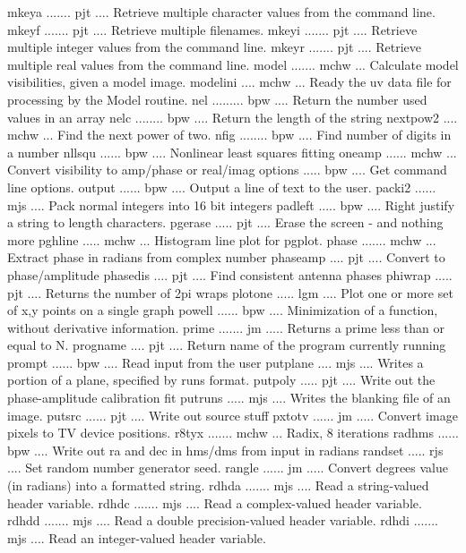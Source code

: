 {\eightpoint\begintt
mkeya ....... pjt .... Retrieve multiple character values from the command line.
mkeyf ....... pjt .... Retrieve multiple filenames. 
mkeyi ....... pjt .... Retrieve multiple integer values from the command line. 
mkeyr ....... pjt .... Retrieve multiple real values from the command line. 
model ....... mchw ... Calculate model visibilities, given a model image. 
\endtt}
{\eightpoint\begintt
modelini .... mchw ... Ready the uv data file for processing by the Model routine. 
nel ......... bpw .... Return the number used values in an array 
nelc ........ bpw .... Return the length of the string 
nextpow2 .... mchw ... Find the next power of two. 
nfig ........ bpw .... Find number of digits in a number 
\endtt}
{\eightpoint\begintt
nllsqu ...... bpw .... Nonlinear least squares fitting 
oneamp ...... mchw ... Convert visibility to amp/phase or real/imag 
options ..... bpw .... Get command line options. 
output ...... bpw .... Output a line of text to the user. 
packi2 ...... mjs .... Pack normal integers into 16 bit integers 
\endtt}
{\eightpoint\begintt
padleft ..... bpw .... Right justify a string to length characters. 
pgerase ..... pjt .... Erase the screen - and nothing more 
pghline ..... mchw ... Histogram line plot for pgplot. 
phase ....... mchw ... Extract phase in radians from complex number 
phaseamp .... pjt .... Convert to phase/amplitude 
\endtt}
{\eightpoint\begintt
phasedis .... pjt .... Find consistent antenna phases 
phiwrap ..... pjt .... Returns the number of 2pi wraps 
plotone ..... lgm .... Plot one or more set of x,y points on a single graph 
powell ...... bpw .... Minimization of a function, without derivative information. 
prime ....... jm ..... Returns a prime less than or equal to N. 
\endtt}
{\eightpoint\begintt
progname .... pjt .... Return name of the program currently running 
prompt ...... bpw .... Read input from the user 
putplane .... mjs .... Writes a portion of a plane, specified by runs format. 
putpoly ..... pjt .... Write out the phase-amplitude calibration fit 
putruns ..... mjs .... Writes the blanking file of an image. 
\endtt}
{\eightpoint\begintt
putsrc ...... pjt .... Write out source stuff 
pxtotv ...... jm ..... Convert image pixels to TV device positions. 
r8tyx ....... mchw ... Radix, 8 iterations 
radhms ...... bpw .... Write out ra and dec in hms/dms from input in radians 
randset ..... rjs .... Set random number generator seed. 
\endtt}
{\eightpoint\begintt
rangle ...... jm ..... Convert degrees value (in radians) into a formatted string. 
rdhda ....... mjs .... Read a string-valued header variable. 
rdhdc ....... mjs .... Read a complex-valued header variable. 
rdhdd ....... mjs .... Read a double precision-valued header variable. 
rdhdi ....... mjs .... Read an integer-valued header variable. 
\endtt}
